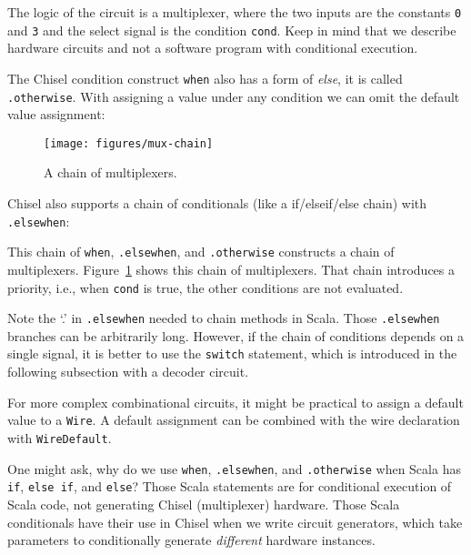\documentclass[%
    10pt,
    headinclude, footexclude,
    openright, %
    notitlepage,
    cleardoubleempty,
    headsepline,
    pointlessnumbers,
    bibtotoc, idxtotoc,
    ]{scrbook}
\newcommand{\scale}{0.7}
\newcommand{\code}[1]{{\lstinline[basicstyle=\small\ttfamily]{#1}}}
\begin{document}
\noindent The logic of the circuit is a multiplexer, where the two inputs are the constants
\code{0} and \code{3} and the select signal is the condition \code{cond}.
Keep in mind that we describe hardware circuits and not a software program with conditional
execution.

The Chisel condition construct \code{when} also has a form of \emph{else}, it is called
\code{.otherwise}. With assigning a value under any condition we can omit the default
value assignment:



\begin{figure}
  \centering
  \texttt{[image: figures/mux-chain]}
  \caption{A chain of multiplexers.}
  \label{fig:mux-chain}
\end{figure}

Chisel also supports a chain of conditionals (like a if/elseif/else chain) with\\ \code{.elsewhen}:


\noindent This chain of \code{when}, \code{.elsewhen}, and \code{.otherwise}
constructs a chain of multiplexers. Figure~\ref{fig:mux-chain} shows this chain of multiplexers.
That chain introduces a priority, i.e., when \code{cond} is true, the other conditions
are not evaluated.

Note the `.' in \code{.elsewhen} needed to chain methods in Scala.
Those \code{.elsewhen} branches can be arbitrarily long.
However, if the chain of conditions depends on a single signal, it is better
to use the \code{switch} statement, which is introduced in the following
subsection with a decoder circuit.

For more complex combinational circuits, it might be practical to assign
a default value to a \code{Wire}. A default assignment can be combined with the wire
declaration with \code{WireDefault}.


One might ask, why do we use \code{when}, \code{.elsewhen}, and \code{.otherwise}
when Scala has \code{if}, \code{else if}, and \code{else}? Those Scala statements are for
conditional execution of Scala code, not generating Chisel (multiplexer) hardware.
Those Scala conditionals have their use in Chisel when we write circuit generators,
which take parameters to conditionally generate \emph{different} hardware instances.
\end{document}

